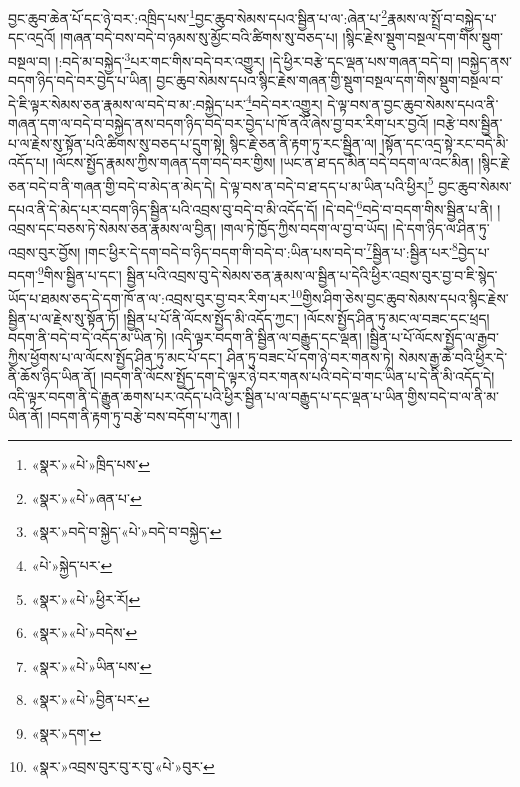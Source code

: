 བྱང་ཆུབ་ཆེན་པོ་དང་ཉེ་བར་:འཁྲིད་པས་\footnote{«སྣར་»«པེ་»ཁྲིད་པས་}བྱང་ཆུབ་སེམས་དཔའ་སྦྱིན་པ་ལ་:ཞེན་པ་\footnote{«སྣར་»«པེ་»ཞན་པ་}རྣམས་ལ་སྤྲོ་བ་བསྐྱེད་པ་དང་འདྲའོ། །གཞན་བདེ་བས་བདེ་བ་ཉམས་སུ་མྱོང་བའི་ཚིགས་སུ་བཅད་པ། །སྙིང་རྗེས་སྡུག་བསྔལ་དག་གིས་སྡུག་བསྔལ་བ། །:བདེ་མ་བསྐྱེད་\footnote{«སྣར་»བདེ་བ་སྐྱེད་«པེ་»བདེ་བ་བསྐྱེད་}པར་གང་གིས་བདེ་བར་འགྱུར། །དེ་ཕྱིར་བརྩེ་དང་ལྡན་པས་གཞན་བདེ་བ། །བསྐྱེད་ནས་བདག་ཉིད་བདེ་བར་བྱེད་པ་ཡིན། བྱང་ཆུབ་སེམས་དཔའ་སྙིང་རྗེས་གཞན་གྱི་སྡུག་བསྔལ་དག་གིས་སྡུག་བསྔལ་བ་དེ་ཇི་ལྟར་སེམས་ཅན་རྣམས་ལ་བདེ་བ་མ་:བསྐྱེད་པར་\footnote{«པེ་»སྐྱེད་པར་}བདེ་བར་འགྱུར། དེ་ལྟ་བས་ན་བྱང་ཆུབ་སེམས་དཔའ་ནི་གཞན་དག་ལ་བདེ་བ་བསྐྱེད་ནས་བདག་ཉིད་བདེ་བར་བྱེད་པ་ཁོ་ནའོ་ཞེས་བྱ་བར་རིག་པར་བྱའོ། །བརྩེ་བས་སྦྱིན་པ་ལ་རྗེས་སུ་སྟོན་པའི་ཚིགས་སུ་བཅད་པ་དྲུག་སྟེ། སྙིང་རྗེ་ཅན་ནི་རྟག་ཏུ་རང་སྦྱིན་ལ། །སྟོན་དང་འདྲ་སྟེ་རང་བདེ་མི་འདོད་པ། །ལོངས་སྤྱོད་རྣམས་ཀྱིས་གཞན་དག་བདེ་བར་གྱིས། །ཡང་ན་ཐ་དད་མིན་བདེ་བདག་ལ་འང་མིན། །སྙིང་རྗེ་ཅན་བདེ་བ་ནི་གཞན་གྱི་བདེ་བ་མེད་ན་མེད་དེ། དེ་ལྟ་བས་ན་བདེ་བ་ཐ་དད་པ་མ་ཡིན་པའི་ཕྱིར།\footnote{«སྣར་»«པེ་»ཕྱིར་རོ།} བྱང་ཆུབ་སེམས་དཔའ་ནི་དེ་མེད་པར་བདག་ཉིད་སྦྱིན་པའི་འབྲས་བུ་བདེ་བ་མི་འདོད་དོ། །དེ་བདེ་\footnote{«སྣར་»«པེ་»བདེས་}བདེ་བ་བདག་གིས་སྦྱིན་པ་ནི། །འབྲས་དང་བཅས་ཏེ་སེམས་ཅན་རྣམས་ལ་བྱིན། །གལ་ཏེ་ཁྱོད་ཀྱིས་བདག་ལ་བྱ་བ་ཡོད། །དེ་དག་ཉིད་ལ་ཤིན་ཏུ་འབྲས་བུར་བྱོས། །གང་ཕྱིར་དེ་དག་བདེ་བ་ཉིད་བདག་གི་བདེ་བ་:ཡིན་པས་བདེ་བ་\footnote{«སྣར་»«པེ་»ཡིན་པས་}སྦྱིན་པ་:སྦྱིན་པར་\footnote{«སྣར་»«པེ་»བྱིན་པར་}བྱེད་པ་བདག་\footnote{«སྣར་»དག་}གིས་སྦྱིན་པ་དང་། སྦྱིན་པའི་འབྲས་བུ་དེ་སེམས་ཅན་རྣམས་ལ་སྦྱིན་པ་དེའི་ཕྱིར་འབྲས་བུར་བྱ་བ་ཇི་སྙེད་ཡོད་པ་ཐམས་ཅད་དེ་དག་ཁོ་ན་ལ་:འབྲས་བུར་བྱ་བར་རིག་པར་\footnote{«སྣར་»འབྲས་བུར་བུ་ར་བུ་«པེ་»བུར་}གྱིས་ཤིག་ཅེས་བྱང་ཆུབ་སེམས་དཔའ་སྙིང་རྗེས་སྦྱིན་པ་ལ་རྗེས་སུ་སྟོན་ཏོ། །སྦྱིན་པ་པོ་ནི་ལོངས་སྤྱོད་མི་འདོད་ཀྱང་། །ལོངས་སྤྱོད་ཤིན་ཏུ་མང་ལ་བཟང་དང་ཕྲད། བདག་ནི་བདེ་བ་དེ་འདོད་མ་ཡིན་ཏེ། །འདི་ལྟར་བདག་ནི་སྦྱིན་ལ་བརྒྱུད་དང་ལྡན། །སྦྱིན་པ་པོ་ལོངས་སྤྱོད་ལ་རྒྱབ་ཀྱིས་ཕྱོགས་པ་ལ་ལོངས་སྤྱོད་ཤིན་ཏུ་མང་པོ་དང་། ཤིན་ཏུ་བཟང་པོ་དག་ཉེ་བར་གནས་ཏེ། སེམས་རྒྱ་ཆེ་བའི་ཕྱིར་དེ་ནི་ཆོས་ཉིད་ཡིན་ནོ། །བདག་ནི་ལོངས་སྤྱོད་དག་དེ་ལྟར་ཉེ་བར་གནས་པའི་བདེ་བ་གང་ཡིན་པ་དེ་ནི་མི་འདོད་དེ། འདི་ལྟར་བདག་ནི་དེ་རྒྱུན་ཆགས་པར་འདོད་པའི་ཕྱིར་སྦྱིན་པ་ལ་བརྒྱུད་པ་དང་ལྡན་པ་ཡིན་གྱིས་བདེ་བ་ལ་ནི་མ་ཡིན་ནོ། །བདག་ནི་རྟག་ཏུ་བརྩེ་བས་བདོག་པ་ཀུན། །
